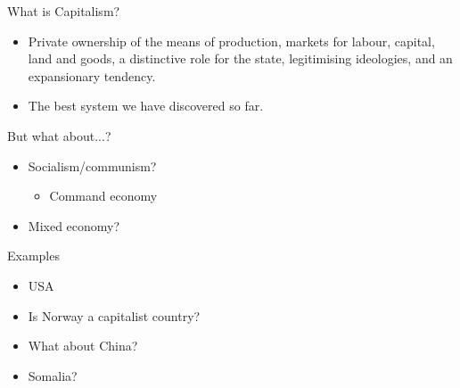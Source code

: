 \documentclass{beamer}
\begin{document}
\begin{frame}{What is Capitalism?}
\begin{itemize}[<+- | alert@+>]
    \item Private ownership of the means of production, markets for labour, capital, land and goods, a distinctive role for the state, legitimising ideologies, and an expansionary tendency.
    \item The best system we have discovered so far.
\end{itemize}{}
\end{frame}{}

\begin{frame}{But what about...?}
\begin{itemize}[<+- | alert@+>]

\item Socialism/communism?
	\begin{itemize}[<+- | alert@+>]
		\item Command economy
	\end{itemize}
\item Mixed economy? 

\end{itemize}		
\end{frame}

\begin{frame}{Examples}
\begin{itemize}[<+- | alert@+>]
    \item USA
    \item Is Norway a capitalist country?
    \item What about China?
    \item Somalia?
\end{itemize}
\end{frame}{}
\end{document}
